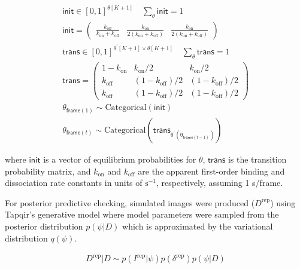 
\begin{gather*}
    \mathsf{init} \in [0, 1]^{\theta[K+1]} \quad \sum_{\theta} \mathsf{init} = 1 \\
    \mathsf{init} = \begin{pmatrix} \frac{k_\mathrm{off}}{k_\mathrm{on} + k_\mathrm{off}} & \frac{k_\mathrm{on}}{2\left( k_\mathrm{on} + k_\mathrm{off} \right)} & \frac{k_\mathrm{on}}{2\left( k_\mathrm{on} + k_\mathrm{off} \right)} \end{pmatrix} \\
    \mathsf{trans} \in [0, 1]^{\theta^\prime[K+1] \times \theta[K+1]} \quad \sum_{\theta} \mathsf{trans} = 1 \\
    \mathsf{trans} = \begin{pmatrix} 1 - k_\mathrm{on} & k_\mathrm{on}/2 & k_\mathrm{on}/2 \\ k_\mathrm{off} & (1 - k_\mathrm{off})/2 & (1 - k_\mathrm{off})/2 \\ k_\mathrm{off} & (1 - k_\mathrm{off})/2 & (1 - k_\mathrm{off})/2 \end{pmatrix} \\
    \theta_{\mathsf{frame}(1)} \sim \mathrm{Categorical(\mathsf{init})} \\
    \theta_{\mathsf{frame}(t)} \sim \mathrm{Categorical(\mathsf{trans}_{\theta^\prime( \theta_{\mathsf{frame}(t-1)})})}
\end{gather*}

\noindent
where $\mathsf{init}$ is a vector of equilibrium probabilities for $\theta$, $\mathsf{trans}$ is the transition probability matrix, and $k_{\mathrm{on}}$ and $k_{\mathrm{off}}$ are the apparent first-order binding and dissociation rate constants in units of $\mathrm{s}^{-1}$, respectively, assuming 1 s/frame.

For posterior predictive checking, simulated images were produced ($D^\mathrm{rep}$) using Tapqir's generative model where model parameters were sampled from the posterior distribution $p(\psi|D)$ which is approximated by the variational distribution $q(\psi)$. %

\begin{gather*}
    D^\mathrm{rep} | D \sim p(I^\mathrm{rep} | \psi) p(\delta^\mathrm{rep}) p(\psi | D)
\end{gather*}

